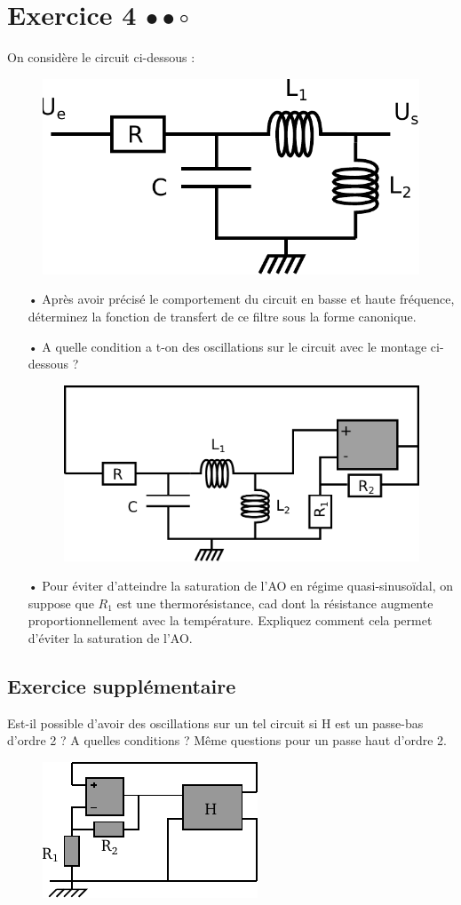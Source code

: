 \documentclass{report}
\begin{document}
\newpage

\section*{Exercice 4 $\bullet\bullet\circ$}

On considère le circuit ci-dessous :

\begin{figure}[!h]
\centering
\includegraphics[width=0.4\linewidth]{resonnateur.pdf}
\end{figure}

\begin{itemize}
	\item[•]  Après avoir précisé le comportement du circuit en basse et haute fréquence, déterminez la fonction de transfert de ce filtre sous la forme canonique.
	\item[•] A quelle condition a t-on des oscillations sur le circuit avec le montage ci-dessous ?
	
	\begin{figure}[!h]
\centering
\includegraphics[width=0.4\linewidth]{resonnateur2.pdf}
\end{figure}

	\item[•] Pour éviter d'atteindre la saturation de l'AO en régime quasi-sinusoïdal, on suppose que $R_1$ est une thermorésistance, cad dont la résistance augmente proportionnellement avec la température. Expliquez comment cela permet d'éviter la saturation de l'AO.

\end{itemize}

\subsection*{Exercice supplémentaire}
Est-il possible d'avoir des oscillations sur un tel circuit si H est un passe-bas d'ordre 2 ? A quelles conditions ? 
Même questions pour un passe haut d'ordre 2.
\begin{figure}[!h]
\centering
\includegraphics[width=0.3\linewidth]{circuit_9.pdf}
\end{figure}
\end{document}
